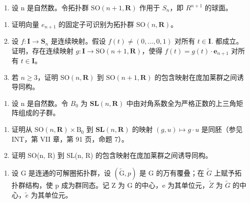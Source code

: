 \begin{enumerate}
\def\labelenumi{\arabic{enumi})}
\setcounter{enumi}{2}
\tightlist
\item
  设 n 是自然数。令拓扑群 \(\mathrm{SO}(n+1,\mathbf{R})\) 作用于 \(S_{n}\)，即 \(R^{n+1}\) 的球面。
\end{enumerate}

\begin{enumerate}
\def\labelenumi{\alph{enumi})}
\item
  证明向量 \(e_{n+1}\) 的固定子可识别为拓扑群 \(\mathrm{SO}(n,\mathbf{R})\)。
\item
  设 \(f \colon \mathbf{I} \to \mathbf{S}_n\) 是连续映射。假设 \(f(t) \neq (0, \ldots, 0, 1)\) 对所有 \(t \in \mathbf{I} .\) 都成立。证明，存在连续映射 \(g \colon \mathbf{I} \to \mathrm{SO}(n + 1, \mathbf{R})\)，使得 \(f(t) = g(t) \cdot \mathbf{e}_{n+1}\) 对所有 \(t \in \mathbf{I} \)。
\item
  若 \(n \geqslant 3\)，证明 \(\mathrm{SO}(n, \mathbf{R})\) 到 \(\mathrm{SO}(n+1, \mathbf{R})\) 的包含映射在庞加莱群之间诱导同构。
\end{enumerate}

\begin{enumerate}
\def\labelenumi{\arabic{enumi})}
\setcounter{enumi}{3}
\tightlist
\item
  设 n 是自然数。令 \(B_{0}\) 为 \(\mathbf{SL}(n,\mathbf{R})\) 中由对角系数全为严格正数的上三角矩阵组成的子群。
\end{enumerate}

\begin{enumerate}
\def\labelenumi{\alph{enumi})}
\item
  证明从 \(\mathrm{SO}(n,\mathbf{R})\times\mathrm{B}_{0}\) 到 \(\mathbf{SL}(n,\mathbf{R})\) 的映射 \((g,u)\mapsto g\cdot u\) 是同胚（参见 INT，第 VII 章，第 91 页，命题 7）。
\item
  证明 SO(n, R) 到 SL(n, R) 的包含映射在庞加莱群之间诱导同构。
\end{enumerate}

\begin{enumerate}
\def\labelenumi{\arabic{enumi})}
\setcounter{enumi}{4}
\tightlist
\item
  设 G 是连通的可解圈拓扑群，设 \((\widetilde{\mathrm{G}}, p)\) 是 G 的万有覆叠；在 \(\widetilde{G}\) 上赋予拓扑群结构，使 p 成为群同态。记 Z 为 G 的中心，e 为其单位元，\(\widetilde{Z}\) 为 \(\widetilde{G}\) 的中心，\(\widetilde{e}\) 为其单位元。
\end{enumerate}


